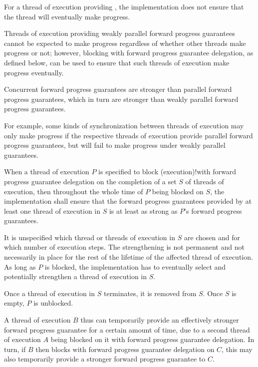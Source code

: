 \pnum
{}%
For a thread of execution providing , the implementation does not ensure that the thread will eventually
make progress.

\pnum
\begin{note}
Threads of execution providing weakly parallel forward progress guarantees cannot
be expected to make progress regardless of whether other threads make progress or
not; however, blocking with forward progress guarantee delegation, as defined below,
can be used to ensure that such threads of execution make progress eventually.
\end{note}

\pnum
Concurrent forward progress guarantees are stronger than parallel forward progress
guarantees, which in turn are stronger than weakly parallel forward progress
guarantees.
\begin{note}
For example, some kinds of synchronization between threads of execution may only
make progress if the respective threads of execution provide parallel forward progress
guarantees, but will fail to make progress under weakly parallel guarantees.
\end{note}

\pnum
{}%
When a thread of execution $P$ is specified to
{block (execution)!with forward progress guarantee delegation}
on the completion of a set $S$ of threads of execution,
then throughout the whole time of $P$ being blocked on $S$,
the implementation shall ensure that the forward progress guarantees
provided by at least one thread of execution in $S$
is at least as strong as $P$'s forward progress guarantees.
\begin{note}
It is unspecified which thread or threads of execution in $S$ are chosen
and for which number of execution steps. The strengthening is not permanent and
not necessarily in place for the rest of the lifetime of the affected thread of
execution. As long as $P$ is blocked, the implementation has to eventually
select and potentially strengthen a thread of execution in $S$.
\end{note}
Once a thread of execution in $S$ terminates, it is removed from $S$.
Once $S$ is empty, $P$ is unblocked.

\pnum
\begin{note}
A thread of execution $B$ thus can temporarily provide an effectively
stronger forward progress guarantee for a certain amount of time, due to a
second thread of execution $A$ being blocked on it with forward
progress guarantee delegation. In turn, if $B$ then blocks with
forward progress guarantee delegation on $C$, this may also temporarily
provide a stronger forward progress guarantee to $C$.
\end{note}

